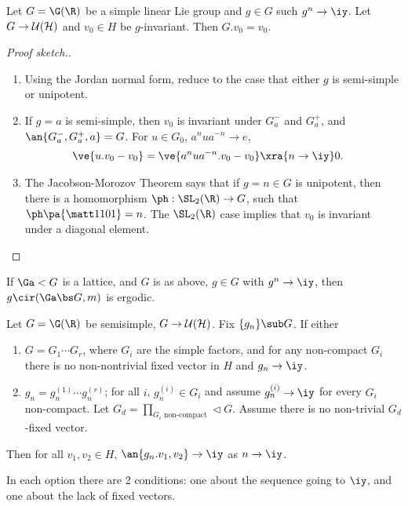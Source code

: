 \begin{thm}
Let $G=\G(\R)$ be a simple linear Lie group and $g\in G$ such $g^n\to \iy$. Let $G\to \cal U(H)$ and $v_0\in H$ be $g$-invariant. Then $G.v_0=v_0$. 
\end{thm}
\begin{proof}[Proof sketch.]
\begin{enumerate}
\item
Using the Jordan normal form, reduce to the case that either $g$ is semi-simple or unipotent.
\item
If $g=a$ is semi-simple, 
then $v_0$ is invariant under $G_a^-$ and $G_a^+$, and $\an{G_a^-, G_a^+, a}=G$. 
For $u\in G_0$, $a^n ua^{-n}\to e$, 
\begin{align}
\ve{u.v_0-v_0} &= 
\ve{a^n u a^{-n}.v_0-v_0} \xra{n\to \iy}0.
\end{align}
\item
The Jacobson-Morozov Theorem says that if $g=n\in G$ is unipotent, then there is a homomorphism $\ph:\SL_2(\R)\to G$, such that $\ph\pa{\matt 1101}=n$. 
The $\SL_2(\R)$ case implies that $v_0$ is invariant under a diagonal element. 
\end{enumerate}
\end{proof}
\begin{cor}
If $\Ga< G$ is a lattice, and $G$ is as above, $g\in G$ with $g^n\to \iy$, then $g\cir (\Ga\bs G, m)$ is ergodic. %
\end{cor}
\begin{thm}
Let $G=\G(\R)$ be semisimple, $G\to \cal U(H)$. Fix $\{g_n\}\sub G$.  If either
\begin{enumerate}
\item 
$G=G_1\cdots G_r$, where $G_i$ are the simple factors, and %
for any non-compact $G_i$ there is no non-nontrivial fixed vector in $H$ and $g_n\to \iy$. 
\item
$g_n=g_n^{(1)}\cdots g_n^{(r)}$; for all $i$, $g_n^{(i)}\in G_i$ and assume $g_n^{(i)}\to \iy$ for every $G_i$ non-compact. Let $G_d=\prod_{G_i\text{ non-compact}}\triangleleft G$. Assume there is no non-trivial $G_d$-fixed vector. 
\end{enumerate}
Then for all $v_1,v_2\in H$, $\an{g_n.v_1,v_2}\to \iy$ as $n\to \iy$. 
\end{thm}
In each option there are 2 conditions: one about the sequence going to $\iy$, and one about the lack of fixed vectors. 

